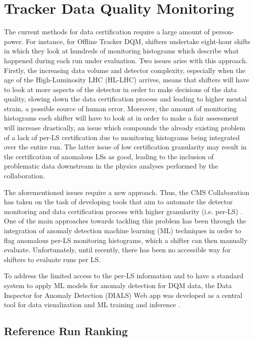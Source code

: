 \chapter{Tracker Data Quality Monitoring}

The current methods for data certification require a large amount of person-power. For instance, for Offline Tracker DQM, shifters undertake eight-hour shifts in which they look at hundreds of monitoring histograms which describe what happened during each run under evaluation. Two issues arise with this approach. Firstly, the increasing data volume and detector complexity, especially when the age of the High-Luminosity LHC (HL-LHC) arrives, means that shifters will have to look at more aspects of the detector in order to make decisions of the data quality, slowing down the data certification process and leading to higher mental strain, a possible source of human error. Moreover, the amount of monitoring histograms each shifter will have to look at in order to make a fair assessment will increase drastically, an issue which compounds the already existing problem of a lack of per-LS certification due to monitoring histograms being integrated over the entire run. The latter issue of low certification granularity may result in the certification of anomalous LSs as good, leading to the inclusion of problematic data downstream in the physics analyses performed by the collaboration.

The aforementioned issues require a new approach. Thus, the CMS Collaboration has taken on the task of developing tools that aim to automate the detector monitoring and data certification process with higher granularity (i.e. per-LS) \cite{}. One of the main approaches towards tackling this problem has been through the integration of anomaly detection machine learning (ML) techniques in order to flag anomalous per-LS monitoring histograms, which a shifter can then manually evaluate. Unfortunately, until recently, there has been no accessible way for shifters to evaluate runs per LS. 

To address the limited access to the per-LS information and to have a standard system to apply ML models for anomaly detection for DQM data, the Data Inspector for Anomaly Detection (DIALS) Web app was developed as a central tool for data visualization and ML training and inference \cite{}. 

\section{Reference Run Ranking}

